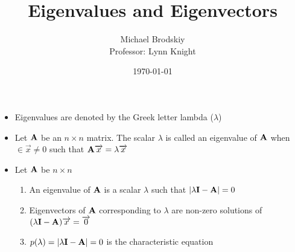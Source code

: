 \documentclass[12pt]{article}
\title{Eigenvalues and Eigenvectors}
\date{\today}
\author{Michael Brodskiy\\ \small Professor: Lynn Knight}
\begin{document}
\maketitle

\begin{itemize}

  \item Eigenvalues are denoted by the Greek letter lambda ($\lambda$)

  \item Let $\bold{A}$ be an $n\times n$ matrix. The scalar $\lambda$ is called an eigenvalue of $\bold{A}$ when $\in\overrightarrow{x}\neq0$ such that $\bold{A}\overrightarrow{x}=\lambda\overrightarrow{x}$

  \item Let $\bold{A}$ be $n\times n$

    \begin{enumerate}

      \item An eigenvalue of $\bold{A}$ is a scalar $\lambda$ such that $|\lambda\bold{I}-\bold{A}|=0$

      \item Eigenvectors of $\bold{A}$ corresponding to $\lambda$ are non-zero solutions of $(\lambda\bold{I}-\bold{A})\overrightarrow{x}=\overrightarrow{0}$

      \item $p(\lambda)=|\lambda\bold{I}-\bold{A}|=0$ is the characteristic equation

    \end{enumerate}

\end{itemize}
\end{document}
